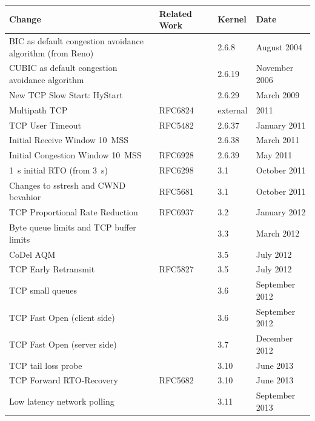 \begin{table}[htbp]
	\begin{tabu}{X[1.4]XX[0.4]X[0.7]}
	\toprule
	\textbf{Change} & \textbf{Related Work} & \textbf{Kernel} & \textbf{Date} \\
	\midrule
	BIC as default congestion avoidance algorithm (from Reno) & & 2.6.8 & August 2004 \\
	CUBIC as default congestion avoidance algorithm & \cite{ha2008cubic} & 2.6.19 & November 2006 \\
	New TCP Slow Start: HyStart & \cite{Ha20112092} & 2.6.29 & March 2009 \\
	Multipath TCP & RFC6824 & external & 2011 \\
	TCP User Timeout & RFC5482~\cite{rfc5482} & 2.6.37 & January 2011 \\
	Initial Receive Window \SI{10}{MSS} & \cite{rfc6928} & 2.6.38 & March 2011 \\
	Initial Congestion Window \SI{10}{MSS} & RFC6928~\cite{rfc6928} & 2.6.39 & May 2011 \\
	\SI{1}{\second} initial RTO (from \SI{3}{\second}) & RFC6298 & 3.1 & October 2011 \\
	Changes to sstresh and CWND bevahior & RFC5681~\cite{rfc5681} & 3.1 & October 2011 \\ %
	TCP Proportional Rate Reduction & RFC6937~\cite{rfc6937} & 3.2 & January 2012 \\
	Byte queue limits and TCP buffer limits &  & 3.3 & March 2012 \\ %
	CoDel AQM & \cite{nichols2014codel} & 3.5 & July 2012 \\
	TCP Early Retransmit & RFC5827~\cite{rfc5827} & 3.5 & July 2012 \\
	TCP small queues & & 3.6 & September 2012 \\ %
	TCP Fast Open (client side) & \cite{cheng2014tcptfo} & 3.6 & September 2012 \\
	TCP Fast Open (server side) & & 3.7 & December 2012 \\
	TCP tail loss probe & & 3.10 & June 2013 \\ %
	TCP Forward RTO-Recovery & RFC5682~\cite{rfc5682} & 3.10 & June 2013 \\
	Low latency network polling & & 3.11 & September 2013 \\ %

\end{tabu}
\end{table}
